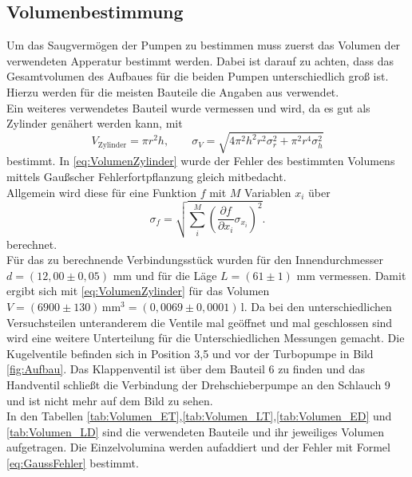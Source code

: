 \subsection{Volumenbestimmung}
Um das Saugvermögen der Pumpen zu bestimmen muss zuerst das Volumen der verwendeten Apperatur bestimmt werden. Dabei ist
darauf zu achten, dass das Gesamtvolumen des Aufbaues für die beiden Pumpen unterschiedlich groß ist.\\
Hierzu werden für die meisten Bauteile die Angaben aus \cite{Anleitung} verwendet.\\
Ein weiteres verwendetes Bauteil wurde vermessen und wird, da es gut als Zylinder genähert werden kann, mit
\begin{equation}
  V_{\text{Zylinder}}=\pi r^2 h, \qquad \sigma_{V}=\sqrt{4 \pi^{2} h^{2} r^{2} \sigma_{r}^{2}  + \pi^{2} r^{4} \sigma_{h}^{2} }
\label{eq:VolumenZylinder}
\end{equation}
bestimmt. In \ref{eq:VolumenZylinder} wurde der Fehler des bestimmten Volumens mittels Gaußscher Fehlerfortpflanzung gleich mitbedacht.\\
Allgemein wird diese für eine Funktion $f$ mit $M$ Variablen $x_i$ über
\begin{equation}
  \label{eq:GaussFehler}
  \sigma_f= \sqrt{ \sum_i^M \left(\frac{\partial f}{\partial x_i} \sigma_{x_i}\right)^2}.
\end{equation}
berechnet.\\
Für das zu berechnende Verbindungsstück wurden für den Innendurchmesser $d=(12,00 \pm 0,05)$ mm und für die Läge $L=(61\pm 1)$ mm vermessen.
Damit ergibt sich mit \ref{eq:VolumenZylinder} für das Volumen $V=(6900 \pm 130)\,\text{mm}^3 = (0,0069 \pm 0,0001)$\,l.
Da bei den unterschiedlichen Versuchsteilen unteranderem die Ventile mal geöffnet und mal geschlossen sind wird eine weitere Unterteilung
für die Unterschiedlichen Messungen gemacht. Die Kugelventile befinden sich in Position 3,5 und vor der Turbopumpe in Bild \ref{fig:Aufbau}.
Das Klappenventil ist über dem Bauteil 6 zu finden und das Handventil schließt die Verbindung der Drehschieberpumpe an den Schlauch 9 und ist nicht mehr
auf dem Bild zu sehen.\\
In den Tabellen \ref{tab:Volumen_ET},\ref{tab:Volumen_LT},\ref{tab:Volumen_ED} und \ref{tab:Volumen_LD} sind die verwendeten Bauteile
 und ihr jeweiliges Volumen aufgetragen.
Die Einzelvolumina werden aufaddiert und der Fehler mit Formel \ref{eq:GaussFehler} bestimmt.

